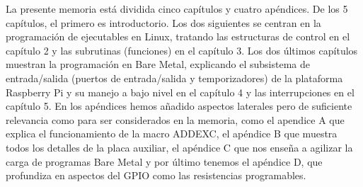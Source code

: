 La presente memoria está dividida cinco capítulos y cuatro
apéndices. De los 5 capítulos, el primero es introductorio. Los dos
siguientes se centran en la programación de ejecutables en Linux,
tratando las estructuras de control en el capítulo 2 y las subrutinas
(funciones) en el capítulo 3. Los dos últimos capítulos muestran la
programación en Bare Metal, explicando el subsistema de entrada/salida
(puertos de entrada/salida y temporizadores) de la plataforma
Raspberry Pi y su manejo a bajo nivel en el capítulo 4 y las
interrupciones en el capítulo 5.  En los apéndices hemos añadido
aspectos laterales pero de suficiente relevancia como para ser
considerados en la memoria, como el apendice A que explica el
funcionamiento de la macro ADDEXC, el apéndice B que muestra todos los
detalles de la placa auxiliar, el apéndice C que nos enseña a agilizar
la carga de programas Bare Metal y por último tenemos el apéndice D,
que profundiza en aspectos del GPIO como las resistencias
programables.

